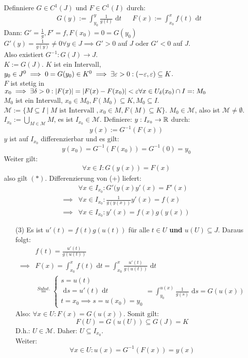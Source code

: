 \documentclass[a4paper,twoside,DIV15,BCOR12mm,chapterprefix=true,headings=twolinechapter]{scrbook}
\begin{document}
\begin{beweis}
Definniere $G\in C^1(J)$ und $F\in C^1(I)$ durch:
\begin{align*}
&G(y):=\int_{y_0}^y \frac 1{g(t)}\text{ d}t &&F(x):=\int_{x_0}^x f(t)\text{ d}t
\end{align*}
Dann: $G'=\frac 1g, F'=f,F(x_0)=0=G(y_0)$\\
$G'(y)=\frac 1{g(y)}\ne 0 \forall y\in J \implies G'>0$ auf $J$ oder $G'<0$ auf $J$.\\
Also existiert $G^{-1}:G(J)\to J$.\\
$K:=G(J)$. $K$ ist ein Intervall, $y_0\in J^0\implies 0=G(y_0)\in K^0\implies \exists \varepsilon>0:
(-\varepsilon,\varepsilon)\subseteq K$.\\
$F$ ist stetig in $x_0\implies \exists \delta>0: |F(x)|=|F(x)-F(x_0)|<\varepsilon \forall x\in U_\delta(x_0)\cap I=:M_0$\\
$M_0$ ist ein Intervall, $x_0\in M_0, F(M_0)\subseteq K, M_0\subseteq I$.
$\mathcal{M}:=\{M\subseteq I\mid M \text{ ist Intervall },x_0\in M,F(M)\subseteq K\}$. $M_0\in\mathcal{M}$,
also ist $\mathcal{M}\ne\emptyset$.\\
$I_{x_0}:=\bigcup_{M\in\mathcal{M}} M$, es ist $I_{x_0}\in\mathcal{M}$. Definiere:
$y:I_{x_0}\to\mathbb{R}$ durch:
\[y(x):=G^{-1}(F(x))\]
$y$ ist auf $I_{x_0}$ differenzierbar und es gilt: 
\[y(x_0)=G^{-1}(F(x_0))=G^{-1}(0)=y_0\]
Weiter gilt:
\begin{align*}\forall x\in I: G(y(x))=F(x)\tag{+}\end{align*}
also gilt $(*)$.
Differenzierung von (+) liefert:
\begin{align*}
&\forall x\in I_{x_0}: G'(y(x)y'(x)=F'(x)\\
\implies &\forall x\in I_{x_0}: \frac 1{g(y(x))}y'(x)=f(x)\\
\implies &\forall x\in I_{x_0}: y'(x)=f(x)g(y(x))
\end{align*}
\begin{itemize}
\item[(3)] Es ist $u'(t)=f(t)g(u(t))$ für alle $t\in U$ \textbf{und} $u(U)\subseteq J$.
Daraus folgt:
\begin{align*}
&f(t)=\frac{u'(t)}{g(u(t))}\\
\implies &F(x)=\int_{x_0}^x f(t)\text{ d}t=\int_{x_0}^x \frac{u'(t)}{g(u(t))}\text{ d}t\\
&\stackrel{Subst.}{=}
\begin{cases}
s=u(t)\\
\text{ d}s= u'(t)\text{ d}t\\
t=x_0\implies s=u(x_0)=y_0
\end{cases}=\int_{y_0}^{u(x)}\frac 1{g(s)}\text{ d}s=G(u(x))
\end{align*}
Also: $\forall x\in U:F(x)=G(u(x))$. Somit gilt:
\[F(U)=G(u(U))\subseteq G(J)=K\]
D.h.: $U\in\mathcal{M}$. Daher: $U\subseteq I_{x_0}$.\\
Weiter:
\[\forall x\in U: u(x)=G^{-1}(F(x))=y(x)\]
\end{itemize}
\end{beweis}
\end{document}
